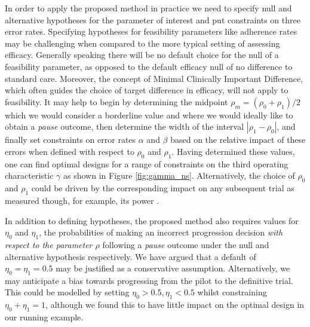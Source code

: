 \documentclass[referee, lineno, pdflatex,sn-vancouver,Numbered]{sn-jnl}%
\theoremstyle{thmstyleone}%
\theoremstyle{thmstyletwo}%
\theoremstyle{thmstylethree}%
\begin{document}

In order to apply the proposed method in practice we need to specify null and alternative hypotheses for the parameter of interest and put constraints on three error rates. Specifying hypotheses for feasibility parameters like adherence rates may be challenging when compared to the more typical setting of assessing efficacy. Generally speaking there will be no default choice for the null of a feasibility parameter, as opposed to the default efficacy null of no difference to standard care. Moreover, the concept of Minimal Clinically Important Difference, which often guides the choice of target difference in efficacy, will not apply to  feasibility. It may help to begin by determining the midpoint $\rho_m = (\rho_0 + \rho_1)/2$ which we would consider a borderline value and where we would ideally like to obtain a \emph{pause} outcome, then determine the width of the interval $|\rho_1 - \rho_0|$, and finally set constraints on error rates $\alpha$ and $\beta$ based on the relative impact of these errors when defined with respect to $\rho_0$ and $\rho_1$. Having determined these values, one can find optimal designs for a range of constraints on the third operating characteristic $\gamma$ as shown in Figure \ref{fig:gamma_ns}. Alternatively, the choice of $\rho_0$ and $\rho_1$ could be driven by the corresponding impact on any subsequent trial as measured though, for example, its power \cite{Wilson2021a}. 

In addition to defining hypotheses, the proposed method also requires values for $\eta_0$ and $\eta_1$, the probabilities of making an incorrect progression decision \emph{with respect to the parameter $\rho$} following a \emph{pause} outcome under the null and alternative hypothesis respectively. We have argued that a default of $\eta_0 = \eta_1 = 0.5$ may be justified as a conservative assumption. Alternatively, we may anticipate a bias towards progressing from the pilot to the definitive trial. This could be modelled by setting $\eta_0 > 0.5, \eta_1 < 0.5$ whilst constraining $\eta_0 + \eta_1 = 1$, although we found this to have little impact on the optimal design in our running example. 
\end{document}
